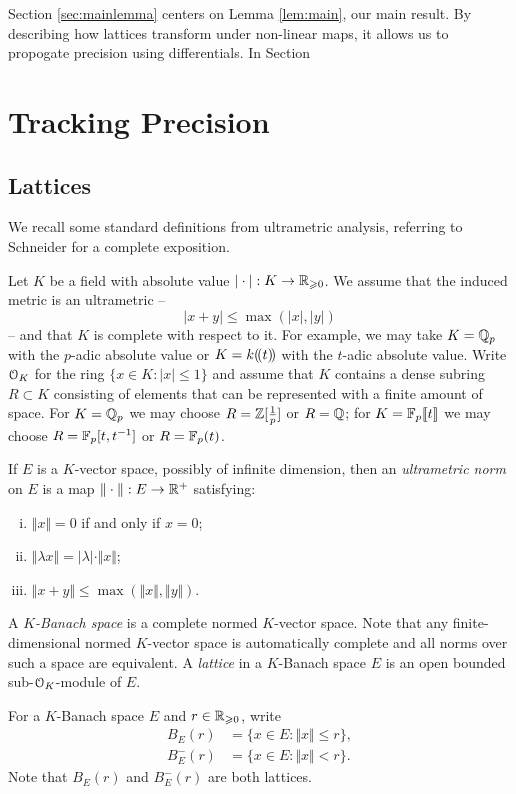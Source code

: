 \documentclass{lms}
\begin{document}
Section \ref{sec:mainlemma} centers on Lemma \ref{lem:main}, our main result.
By describing how lattices transform under non-linear maps, it allows us to propogate
precision using differentials.  In Section 

\section{Tracking Precision} \label{sec:prec-proposal}

\subsection{Lattices}

We recall some standard definitions from ultrametric analysis, referring to
Schneider \cite{schneider:11a} for a complete exposition.

Let $K$ be a field with absolute value $|\cdot| : K \to \mathbb R_{\geqslant 0}$.
We assume that the induced metric is an ultrametric -- 
\[ \lvert x + y \rvert \leq \max(\lvert x \rvert, \lvert y \rvert) \]
-- and that $K$ is complete with respect to it.
For example, we may take $K = \mathbb Q_p$ with the
$p$-adic absolute value or $K = k(\!( t )\!)$ with the $t$-adic absolute value.
Write $\OK$ for the ring $\{x \in K : \lvert x \rvert \le 1\}$ and assume
that $K$ contains a dense subring $R \subset K$
consisting of elements that can be represented with a finite amount of space.
For $K = \mathbb Q_p$ we may choose $R = \mathbb Z[\frac1p]$ or $R = \mathbb Q$;
for $K = \mathbb{F}_p\llbracket t \rrbracket$ we may choose $R = \mathbb{F}_p[t, t^{-1}]$ or $R = \mathbb{F}_p(t)$.

If $E$ is a $K$-vector space, possibly of infinite dimension, then an
\emph{ultrametric norm} on $E$ is a map $\Vert\cdot\Vert : E \to \mathbb R^+$ satisfying:
\begin{enumerate}[(i)]
\item $\Vert x\Vert = 0$ if and only if $x = 0$;
\item $\Vert \lambda x\Vert = |\lambda| \cdot \Vert x\Vert$;
\item $\Vert x+y\Vert \leq \max(\Vert x\Vert, \Vert y\Vert)$.
\end{enumerate}
A \emph{$K$-Banach space} is a complete normed $K$-vector space.  Note that any finite-dimensional
normed $K$-vector space is automatically complete and all norms over such a space are equivalent.
A \emph{lattice} in a $K$-Banach space $E$ is an open bounded sub-$\OK$-module of $E$.

For a $K$-Banach space $E$ and $r \in \mathbb R_{\geqslant 0}$, write
\begin{align*}
B_E(r) &= \{ x \in E : \Vert x \Vert \le r \}, \\
B^-_E(r) &= \{ x \in E : \Vert x \Vert < r\}.
\end{align*}
Note that $B_E(r)$ and $B^-_E(r)$ are both lattices.
\end{document}

